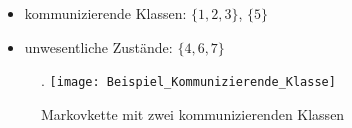 \mbox{}
\begin{itemize}
\item kommunizierende Klassen: $\lbrace 1,2,3 \rbrace$, $\lbrace 5 \rbrace$
\item unwesentliche Zustände: $\lbrace 4,6,7 \rbrace$
\end{itemize}
\begin{figure}[H].
\centering
\texttt{[image: Beispiel\_Kommunizierende\_Klasse]}
\caption{Markovkette mit zwei kommunizierenden Klassen}
\end{figure}
\noindent